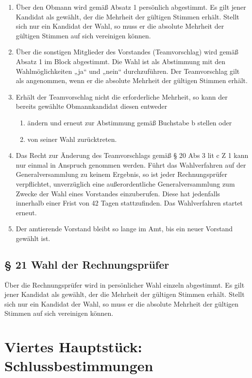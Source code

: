 \documentclass[10pt,a4paper]{article}
\begin{document}
\begin{enumerate}[label=\alph*)]
\item
Über den Obmann wird gemäß Absatz 1 persönlich abgestimmt.
Es gilt jener Kandidat als gewählt, der die Mehrheit der gültigen Stimmen erhält.
Stellt sich nur ein Kandidat der Wahl, so muss er die absolute Mehrheit der gültigen Stimmen auf sich vereinigen können.
\item
Über die sonstigen Mitglieder des Vorstandes (Teamvorschlag) wird gemäß Absatz 1 im Block abgestimmt.
Die Wahl ist als Abstimmung mit den Wahlmöglichkeiten „ja“ und „nein“ durchzuführen.
Der Teamvorschlag gilt als angenommen, wenn er die absolute Mehrheit der gültigen Stimmen erhält.
\item
Erhält der Teamvorschlag nicht die erforderliche Mehrheit, so kann der bereits gewählte Obmannkandidat diesen entweder
\begin{enumerate}[label=\arabic*]
\item
ändern und erneut zur Abstimmung gemäß Buchstabe b stellen oder
\item
von seiner Wahl zurücktreten.
\end{enumerate}
\item
Das Recht zur Änderung des Teamvorschlags gemäß § 20 Abs 3 lit c Z 1 kann nur einmal in Anspruch genommen werden.
Führt das Wahlverfahren auf der Generalversammlung zu keinem Ergebnis, so ist jeder Rechnungsprüfer verpflichtet, unverzüglich eine außerordentliche Generalversammlung zum Zwecke der Wahl eines Vorstandes einzuberufen.
Diese hat jedenfalls innerhalb einer Frist von 42 Tagen stattzufinden.
Das Wahlverfahren startet erneut.
\item
Der amtierende Vorstand bleibt so lange im Amt, bis ein neuer Vorstand gewählt ist.
\end{enumerate}

\subsection{§ 21
Wahl der Rechnungsprüfer}

Über die Rechnungsprüfer wird in persönlicher Wahl einzeln abgestimmt.
Es gilt jener Kandidat als gewählt, der die Mehrheit der gültigen Stimmen erhält.
Stellt sich nur ein Kandidat der Wahl, so muss er die absolute Mehrheit der gültigen Stimmen auf sich vereinigen können.

\clearpage

\section{Viertes Hauptstück: Schlussbestimmungen}
\end{document}
